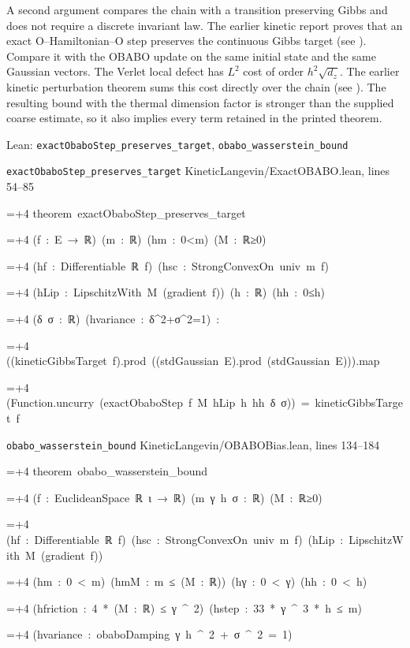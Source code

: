 \documentclass[11pt,a4paper]{article}
\newlength{\leancharwidth}
\newenvironment{leancode}{\par\smallskip\begingroup\ttfamily\footnotesize\raggedright
  \settowidth{\leancharwidth}{M}\setlength{\parskip}{0pt}\setlength{\parindent}{0pt}
  \frenchspacing}{\par\endgroup\smallskip}
\newcommand{\leanline}[2]{\hangindent=\dimexpr#1\leancharwidth+4\leancharwidth\relax
  \hangafter=1\noindent\hspace*{#1\leancharwidth}#2\par}
\newcommand{\leansource}[1]{\par{\footnotesize\color{leanmuted}#1}\par}
\begin{document}
A second argument compares the chain with a transition preserving Gibbs and does not require a discrete invariant law. The earlier kinetic report proves that an exact \(\mathrm O\)–Hamiltonian–\(\mathrm O\) step preserves the continuous Gibbs target (see \cite[Section~3.120.3]{LangevinLean2026Kinetic}). Compare it with the OBABO update on the same initial state and the same Gaussian vectors. The Verlet local defect has \(L^2\) cost of order \(h^2\sqrt{d_z}\). The earlier kinetic perturbation theorem sums this cost directly over the chain (see \cite[Section~3.122.3]{LangevinLean2026Kinetic}). The resulting bound with the thermal dimension factor is stronger than the supplied coarse estimate, so it also implies every term retained in the printed theorem.

\begin{leanbox}{Lean: \texttt{exactObaboStep\_\allowbreak{}preserves\_\allowbreak{}target}, \texttt{obabo\_\allowbreak{}wasserstein\_\allowbreak{}bound}}
\leansource{\texttt{exactObaboStep\_\allowbreak{}preserves\_\allowbreak{}target} \quad KineticLangevin/\allowbreak{}ExactOBABO.lean, lines 54–85}
\begin{leancode}
\leanline{0}{theorem\ exactObaboStep\_preserves\_target}
\leanline{4}{(f\ :\ E\ →\ ℝ)\ (m\ :\ ℝ)\ (hm\ :\ 0<m)\ (M\ :\ ℝ≥0)}
\leanline{4}{(hf\ :\ Differentiable\ ℝ\ f)\ (hsc\ :\ StrongConvexOn\ univ\ m\ f)}
\leanline{4}{(hLip\ :\ LipschitzWith\ M\ (gradient\ f))\ (h\ :\ ℝ)\ (hh\ :\ 0≤h)}
\leanline{4}{(δ\ σ\ :\ ℝ)\ (hvariance\ :\ δ\textasciicircum{}2+σ\textasciicircum{}2=1)\ :}
\leanline{4}{((kineticGibbsTarget\ f).prod\ ((stdGaussian\ E).prod\ (stdGaussian\ E))).map}
\leanline{6}{(Function.uncurry\ (exactObaboStep\ f\ M\ hLip\ h\ hh\ δ\ σ))\ =\ kineticGibbsTarget\ f}
\end{leancode}
\leansource{\texttt{obabo\_\allowbreak{}wasserstein\_\allowbreak{}bound} \quad KineticLangevin/\allowbreak{}OBABOBias.lean, lines 134–184}
\begin{leancode}
\leanline{0}{theorem\ obabo\_wasserstein\_bound}
\leanline{4}{(f\ :\ EuclideanSpace\ ℝ\ ι\ →\ ℝ)\ (m\ γ\ h\ σ\ :\ ℝ)\ (M\ :\ ℝ≥0)}
\leanline{4}{(hf\ :\ Differentiable\ ℝ\ f)\ (hsc\ :\ StrongConvexOn\ univ\ m\ f)\ (hLip\ :\ LipschitzWith\ M\ (gradient\ f))}
\leanline{4}{(hm\ :\ 0\ <\ m)\ (hmM\ :\ m\ ≤\ (M\ :\ ℝ))\ (hγ\ :\ 0\ <\ γ)\ (hh\ :\ 0\ <\ h)}
\leanline{4}{(hfriction\ :\ 4\ *\ (M\ :\ ℝ)\ ≤\ γ\ \textasciicircum{}\ 2)\ (hstep\ :\ 33\ *\ γ\ \textasciicircum{}\ 3\ *\ h\ ≤\ m)}
\leanline{4}{(hvariance\ :\ obaboDamping\ γ\ h\ \textasciicircum{}\ 2\ +\ σ\ \textasciicircum{}\ 2\ =\ 1)}

\end{leancode}
\end{leanbox}
\end{document}
